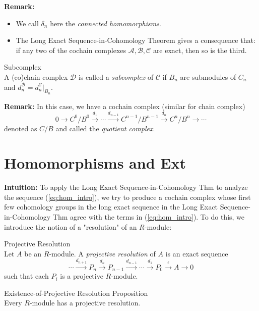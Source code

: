 \noindent\textbf{Remark:} \begin{itemize}
    \item We call $\delta_n$ here the \textit{connected homomorphisms}.
    \item The Long Exact Sequence-in-Cohomology Theorem gives a consequence that: if any two of the cochain complexes $\mathcal{A}, \mathcal{B}, \mathcal{C}$ are exact, then so is the third.
\end{itemize}

\begin{definition}{Subcomplex}\\
A (co)chain complex $\mathcal{D}$ is called a \textit{subcomplex} of $\mathcal{C}$ if $B_n$ are submodules of $C_n$ and $d_n^\mathcal{B}=d_n^\mathcal{C} |_{B_n}$.
\end{definition}

\noindent\textbf{Remark:} In this case, we have a cochain complex (similar for chain complex)
\[
0\to C^0/B^0 \xrightarrow{d_1} \cdots \xrightarrow{d_{n-1}} C^{n-1}/B^{n-1} \xrightarrow{d_n} C^n/B^n \to \cdots
\]
denoted as $C/B$ and called the \textit{quotient complex}.



\section{Homomorphisms and Ext}

\noindent\textbf{Intuition:} To apply the Long Exact Sequence-in-Cohomology Thm to analyze the sequence (\ref{eq:hom_intro}), we try to produce a cochain complex whose first few cohomology groups in the long exact sequence in the Long Exact Sequence-in-Cohomology Thm agree with the terms in (\ref{eq:hom_intro}). To do this, we introduce the notion of a "resolution" of an $R$-module:

\begin{definition}{Projective Resolution}\\
Let $A$ be an $R$-module. A \textit{projective resolution} of $A$ is an exact sequence
\[
\cdots \xrightarrow{d_{n+1}} P_n \xrightarrow{d_n} P_{n-1} \xrightarrow{d_{n-1}} \cdots \xrightarrow{d_1} P_0 \xrightarrow{\epsilon} A\to 0
\]
such that each $P_i$ is a projective $R$-module.
\end{definition}

\begin{proposition}{Existence-of-Projective Resolution Proposition}\\
Every $R$-module has a projective resolution.
\end{proposition}


